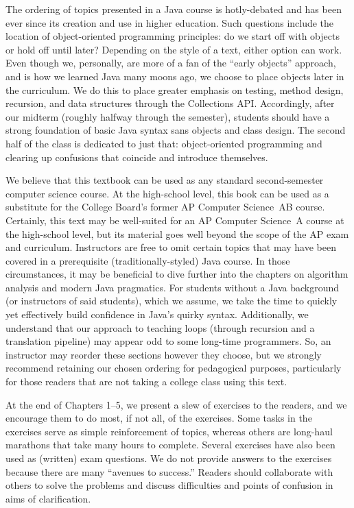 The ordering of topics presented in a Java course is hotly-debated and has been ever since its creation and use in higher education. 
Such questions include the location of object-oriented programming principles: do we start off with objects or hold off until later? 
Depending on the style of a text, either option can work. 
Even though we, personally, are more of a fan of the ``early objects'' approach, and is how we learned Java many moons ago, we choose to place objects later in the curriculum. 
We do this to place greater emphasis on testing, method design, recursion, and data structures through the Collections API. 
Accordingly, after our midterm (roughly halfway through the semester), students should have a strong foundation of basic Java syntax sans objects and class design. 
The second half of the class is dedicated to just that: object-oriented programming and clearing up confusions that coincide and introduce themselves. 

We believe that this textbook can be used as any standard second-semester computer science course. 
At the high-school level, this book can be used as a substitute for the College Board's former AP Computer Science~AB course. 
Certainly, this text may be well-suited for an AP Computer Science~A course at the high-school level, but its material goes well beyond the scope of the AP exam and curriculum.
Instructors are free to omit certain topics that may have been covered in a prerequisite (traditionally-styled) Java course. 
In those circumstances, it may be beneficial to dive further into the chapters on algorithm analysis and modern Java pragmatics. 
For students without a Java background (or instructors of said students), which we assume, we take the time to quickly yet effectively build confidence in Java's quirky syntax. 
Additionally, we understand that our approach to teaching loops (through recursion and a translation pipeline) may appear odd to some long-time programmers. 
So, an instructor may reorder these sections however they choose, but we strongly recommend retaining our chosen ordering for pedagogical purposes, particularly for those readers that are not taking a college class using this text. 

At the end of Chapters 1--5, we present a slew of exercises to the readers, and we encourage them to do most, if not all, of the exercises.
Some tasks in the exercises serve as simple reinforcement of topics, whereas others are long-haul marathons that take many hours to complete. 
Several exercises have also been used as (written) exam questions.
We do not provide answers to the exercises because there are many ``avenues to success.''
Readers should collaborate with others to solve the problems and discuss difficulties and points of confusion in aims of clarification.

